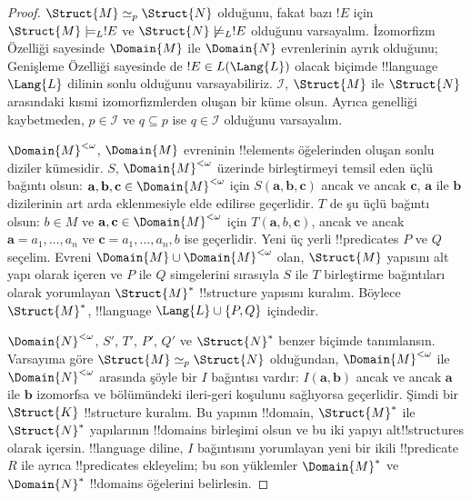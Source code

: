 \documentclass[../../../include/open-logic-section]{subfiles}
\begin{document}
\begin{proof}
$\Struct{M}\simeq_p\Struct{N}$ olduğunu, fakat bazı $!E$ için
$\Struct{M}\models_L !E$ ve $\Struct{N}\not\models_L !E$ olduğunu varsayalım.
İzomorfizm Özelliği sayesinde $\Domain{M}$ ile $\Domain{N}$ evrenlerinin
ayrık olduğunu; Genişleme Özelliği sayesinde de $!E\in L(\Lang{L})$ olacak
biçimde !!{language}~$\Lang{L}$ dilinin sonlu olduğunu varsayabiliriz.
$\mathcal I$, $\Struct{M}$ ile $\Struct{N}$ arasındaki kısmi izomorfizmlerden
oluşan bir küme olsun. Ayrıca genelliği kaybetmeden, $p\in\mathcal I$ ve
$q\subseteq p$ ise $q\in\mathcal I$ olduğunu varsayalım.

$\Domain{M}^{<\omega}$, $\Domain{M}$ evreninin !!{element}s öğelerinden oluşan
sonlu diziler kümesidir. $S$, $\Domain{M}^{<\omega}$ üzerinde birleştirmeyi
temsil eden üçlü bağıntı olsun: $\mathbf a,\mathbf b,\mathbf c\in
\Domain{M}^{<\omega}$ için $S(\mathbf a,\mathbf b,\mathbf c)$ ancak ve ancak
$\mathbf c$, $\mathbf a$ ile $\mathbf b$ dizilerinin art arda eklenmesiyle
elde edilirse geçerlidir. $T$ de şu üçlü bağıntı olsun: $b\in M$ ve
$\mathbf a,\mathbf c\in\Domain{M}^{<\omega}$ için
$T(\mathbf a,b,\mathbf c)$, ancak ve ancak
$\mathbf a=a_1,\dots,a_n$ ve $\mathbf c=a_1,\dots,a_n,b$ ise geçerlidir.
Yeni üç yerli !!{predicate}s $P$ ve $Q$ seçelim. Evreni
$\Domain{M}\cup\Domain{M}^{<\omega}$ olan, $\Struct{M}$ yapısını alt yapı
olarak içeren ve $P$ ile $Q$ simgelerini sırasıyla $S$ ile $T$ birleştirme
bağıntıları olarak yorumlayan $\Struct{M}^*$ !!{structure} yapısını kuralım.
Böylece $\Struct{M}^*$, !!{language} $\Lang{L}\cup\{P,Q\}$ içindedir.

$\Domain{N}^{<\omega}$, $S'$, $T'$, $P'$, $Q'$ ve $\Struct{N}^*$ benzer
biçimde tanımlansın. Varsayıma göre $\Struct{M}\simeq_p\Struct{N}$ olduğundan,
$\Domain{M}^{<\omega}$ ile $\Domain{N}^{<\omega}$ arasında şöyle bir $I$
bağıntısı vardır: $I(\mathbf a,\mathbf b)$ ancak ve ancak $\mathbf a$ ile
$\mathbf b$ izomorfsa ve  bölümündeki
ileri-geri koşulunu sağlıyorsa geçerlidir. Şimdi bir $\Struct{K}$
!!{structure} kuralım. Bu yapının !!{domain}, $\Struct{M}^*$ ile
$\Struct{N}^*$ yapılarının !!{domain}s birleşimi olsun ve bu iki yapıyı
alt!!{structure}s olarak içersin. !!{language} diline, $I$ bağıntısını
yorumlayan yeni bir ikili !!{predicate}~$R$ ile ayrıca !!{predicate}s
ekleyelim; bu son yüklemler $\Domain{M}^*$ ve $\Domain{N}^*$ !!{domain}s
öğelerini belirlesin.


\end{proof}
\end{document}
